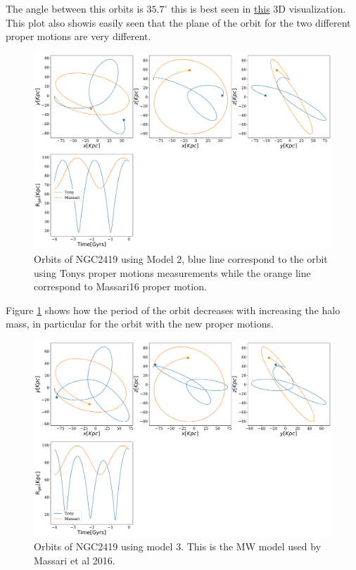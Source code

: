 \documentclass[14pt]{article}
\begin{document}
The angle between this orbits is $35.7^{\circ}$ this is best seen in
\href{https://plot.ly/~jngc/3/orbits/?share_key=FcyuVOnd0LYVXaYhGmSuo9}{this}
3D visualization. This plot also showis easily seen that the plane of the orbit for the two
different proper motions are very different.

\begin{figure}[H]
\centering
\includegraphics[scale=0.3]{../exploratory_code/NGC2419_sphMW.pdf}
\caption{Orbits of NGC2419 using Model 2, blue line correspond to
the orbit using Tonys proper motions measurements while the orange line correspond to
Massari16 proper motion.\label{fig:model2MW}}
\end{figure}

Figure \ref{fig:model2MW} shows how the period of the orbit decreases
with increasing the halo mass, in particular for the orbit with the
new proper motions.


\begin{figure}[H]
\centering
\includegraphics[scale=0.3]{../exploratory_code/NGC2419_Triaxial_MW.pdf}
\caption{Orbits of NGC2419 using model 3. This is the MW model used by
Massari et al 2016.}
\end{figure}
\end{document}
